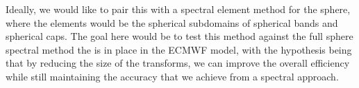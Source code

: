 Ideally, we would like to pair this with a spectral element method for the sphere, where the elements would be the spherical subdomains of spherical bands and spherical caps. The goal here would be to test this method against the full sphere spectral method the is in place in the ECMWF model, with the hypothesis being that by reducing the size of the transforms, we can improve the overall efficiency while still maintaining the accuracy that we achieve from a spectral approach.







  







